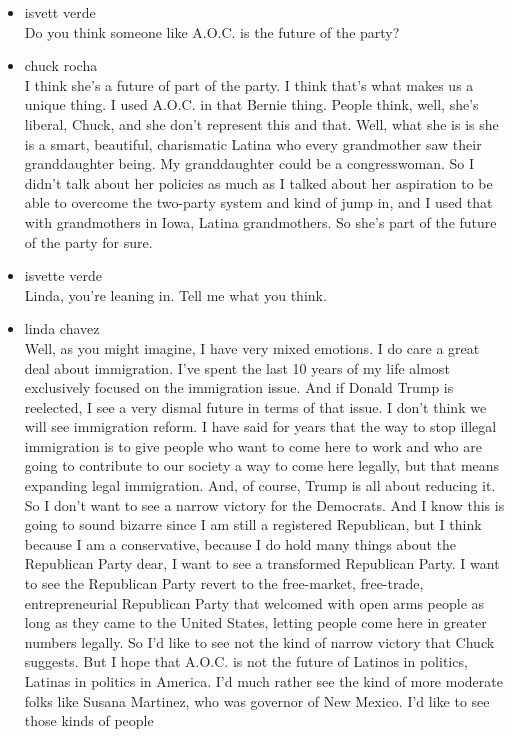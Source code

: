\begin{itemize}
\item
  isvett verde\\
  Do you think someone like A.O.C. is the future of the party?
\item
  chuck rocha\\
  I think she's a future of part of the party. I think that's what makes
  us a unique thing. I used A.O.C. in that Bernie thing. People think,
  well, she's liberal, Chuck, and she don't represent this and that.
  Well, what she is is she is a smart, beautiful, charismatic Latina who
  every grandmother saw their granddaughter being. My granddaughter
  could be a congresswoman. So I didn't talk about her policies as much
  as I talked about her aspiration to be able to overcome the two-party
  system and kind of jump in, and I used that with grandmothers in Iowa,
  Latina grandmothers. So she's part of the future of the party for
  sure.
\item
  isvette verde\\
  Linda, you're leaning in. Tell me what you think.
\item
  linda chavez\\
  Well, as you might imagine, I have very mixed emotions. I do care a
  great deal about immigration. I've spent the last 10 years of my life
  almost exclusively focused on the immigration issue. And if Donald
  Trump is reelected, I see a very dismal future in terms of that issue.
  I don't think we will see immigration reform. I have said for years
  that the way to stop illegal immigration is to give people who want to
  come here to work and who are going to contribute to our society a way
  to come here legally, but that means expanding legal immigration. And,
  of course, Trump is all about reducing it. So I don't want to see a
  narrow victory for the Democrats. And I know this is going to sound
  bizarre since I am still a registered Republican, but I think because
  I am a conservative, because I do hold many things about the
  Republican Party dear, I want to see a transformed Republican Party. I
  want to see the Republican Party revert to the free-market,
  free-trade, entrepreneurial Republican Party that welcomed with open
  arms people as long as they came to the United States, letting people
  come here in greater numbers legally. So I'd like to see not the kind
  of narrow victory that Chuck suggests. But I hope that A.O.C. is not
  the future of Latinos in politics, Latinas in politics in America. I'd
  much rather see the kind of more moderate folks like Susana Martinez,
  who was governor of New Mexico. I'd like to see those kinds of people

\end{itemize}
